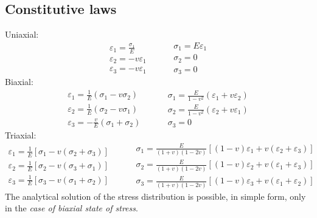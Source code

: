 \documentclass[class=report, crop=false, 12pt,a4paper]{standalone}
\begin{document}
\subsection{Constitutive laws}
Uniaxial:
\begin{equation}
    \begin{array}{l}
        \varepsilon_1 = \frac{\sigma_1}{E}\\
        \varepsilon_2 = -v\varepsilon_1\\
        \varepsilon_3 = -v\varepsilon_1
    \end{array} \hspace{1cm}
    \begin{array}{l}
        \sigma_1 = E\varepsilon_1\\
        \sigma_2 = 0\\
        \sigma_3 = 0
    \end{array}
\end{equation}
Biaxial:
\begin{equation}
    \begin{array}{l}
        \varepsilon_1 = \frac{1}{E} \left(\sigma_1 - v\sigma_2\right)\\
        \varepsilon_2 = \frac{1}{E} \left(\sigma_2 - v\sigma_1\right)\\
        \varepsilon_3 = -\frac{v}{E} \left(\sigma_1 + \sigma_2\right)        
    \end{array} \hspace{1cm}
    \begin{array}{l}
        \sigma_1 = \frac{E}{1-v^2} \left(\varepsilon_1 + v\varepsilon_2\right)\\
        \sigma_2 = \frac{E}{1-v^2} \left(\varepsilon_2 + v\varepsilon_1\right)\\
        \sigma_3 = 0        
    \end{array}
\end{equation}
Triaxial:
\begin{equation}
    \begin{array}{l}
        \varepsilon_1 = \frac{1}{E}\left[\sigma_1 - v\left(\sigma_2 + \sigma_3\right)\right]\\
        \varepsilon_2 = \frac{1}{E}\left[\sigma_2 - v\left(\sigma_3 + \sigma_1\right)\right]\\
        \varepsilon_3 = \frac{1}{E}\left[\sigma_3 - v\left(\sigma_1 + \sigma_2\right)\right]
    \end{array} \hspace{1cm} 
    \begin{array}{l}
        \sigma_1 = \frac{E}{\left(1+v\right)\left(1-2v\right)} \left[\left(1-v\right)\varepsilon_1 + v\left(\varepsilon_2 + \varepsilon_3\right)\right]\\
        \sigma_2 = \frac{E}{\left(1+v\right)\left(1-2v\right)} \left[\left(1-v\right)\varepsilon_2 + v\left(\varepsilon_1 + \varepsilon_3\right)\right]\\
        \sigma_3 = \frac{E}{\left(1+v\right)\left(1-2v\right)} \left[\left(1-v\right)\varepsilon_3 + v\left(\varepsilon_1 + \varepsilon_2\right)\right]
    \end{array}
\end{equation}
The analytical solution of the stress distribution is possible, in simple form, only in the \textit{case of biaxial state of stress}.
\end{document}
